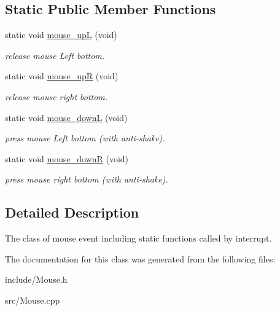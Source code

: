 \subsection*{Static Public Member Functions}
\begin{DoxyCompactItemize}
\item 
\mbox{\label{classMouse_a610a7df6efb6d84962170240a85b8ad7}} 
static void \hyperlink{classMouse_a610a7df6efb6d84962170240a85b8ad7}{mouse\+\_\+upL} (void)
\begin{DoxyCompactList}\small\item\em release mouse Left bottom. \end{DoxyCompactList}\item 
\mbox{\label{classMouse_a7f2be9f8ac560e88726cb0a2e58ff7b7}} 
static void \hyperlink{classMouse_a7f2be9f8ac560e88726cb0a2e58ff7b7}{mouse\+\_\+upR} (void)
\begin{DoxyCompactList}\small\item\em release mouse right bottom. \end{DoxyCompactList}\item 
\mbox{\label{classMouse_ab2ba9ede30f0911ecebf18e7c804dfc5}} 
static void \hyperlink{classMouse_ab2ba9ede30f0911ecebf18e7c804dfc5}{mouse\+\_\+downL} (void)
\begin{DoxyCompactList}\small\item\em press mouse Left bottom (with anti-\/shake). \end{DoxyCompactList}\item 
\mbox{\label{classMouse_a75d714a477733b4b0019e9abb71201a7}} 
static void \hyperlink{classMouse_a75d714a477733b4b0019e9abb71201a7}{mouse\+\_\+downR} (void)
\begin{DoxyCompactList}\small\item\em press mouse right bottom (with anti-\/shake). \end{DoxyCompactList}\end{DoxyCompactItemize}


\subsection{Detailed Description}
The class of mouse event including static functions called by interrupt. 

The documentation for this class was generated from the following files\+:\begin{DoxyCompactItemize}
\item 
include/Mouse.\+h\item 
src/Mouse.\+cpp\end{DoxyCompactItemize}
